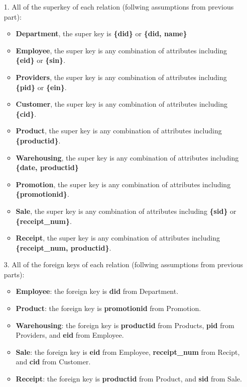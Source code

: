 \documentclass[12pt]{article}
\begin{document}
\begin{enumerate}
    \item[1.] All of the superkey of each relation (follwing assumptions from previous part):
    \begin{itemize}
    \item \textbf{Department}, the super key is \textbf{\{did\}} or \textbf{\{did, name\}}
    \item \textbf{Employee}, the super key is any combination of attributes including \textbf{\{eid\}} or \textbf{\{sin\}}.
    \item \textbf{Providers}, the super key is any combination of attributes including \textbf{\{pid\}} or \textbf{\{ein\}}.
    \item \textbf{Customer}, the super key is any combination of attributes including \textbf{\{cid\}}.
    \item \textbf{Product}, the super key is any combination of attributes including \textbf{\{productid\}}.
    \item \textbf{Warehousing}, the super key is any combination of attributes including \textbf{\{date, productid\}}
    \item \textbf{Promotion}, the super key is any combination of attributes including \textbf{\{promotionid\}}.
    \item \textbf{Sale}, the super key is any combination of attributes including \textbf{\{sid\}} or \textbf{\{receipt\_num\}}.
    \item \textbf{Receipt}, the super key is any combination of attributes including \textbf{\{receipt\_num, productid\}}.
    \end{itemize}
     
    
    \item[3.]  All of the foreign keys of each relation (follwing assumptions from previous parts):
    \begin{itemize}
    \item \textbf{Employee}: the foreign key is \textbf{did} from Department.
    \item \textbf{Product}: the foreign key is \textbf{promotionid} from Promotion.
    \item \textbf{Warehousing}: the foreign key is \textbf{productid} from Products, \textbf{pid} from Providers, and \textbf{eid} from Employee.
    \item \textbf{Sale}: the foreign key is \textbf{eid} from Employee, \textbf{receipt\_num} from Recipt, and \textbf{cid} from Customer.
    \item \textbf{Receipt}: the foreign key is \textbf{productid} from Product, and \textbf{sid} from Sale.
    \end{itemize}
    
\end{enumerate}  
\end{document}
